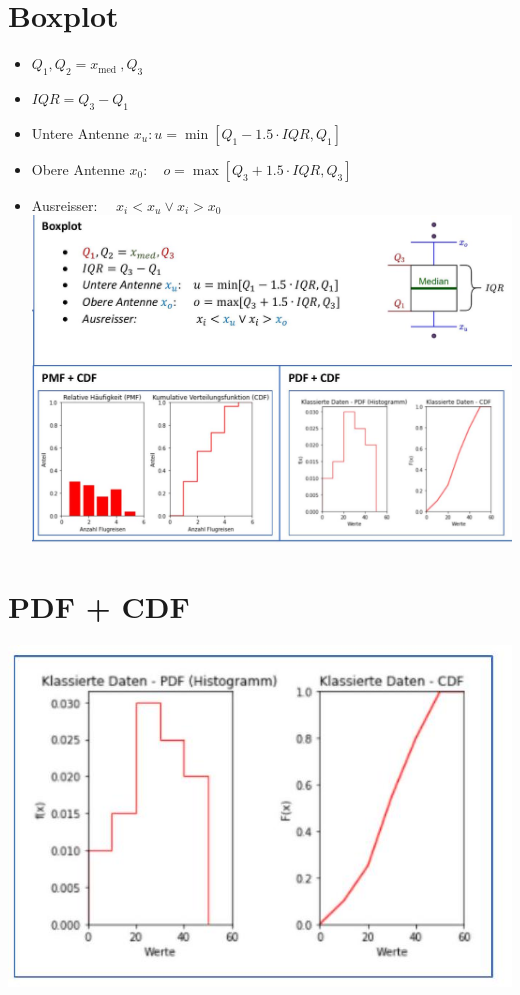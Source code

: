 \documentclass[10pt]{article}
\begin{document}
\section*{Boxplot}
\begin{itemize}
  \item $Q_{1}, Q_{2}=x_{\text {med }}, Q_{3}$
  \item $I Q R=Q_{3}-Q_{1}$
  \item Untere Antenne $x_{u}: u=\min \left[Q_{1}-1.5 \cdot I Q R, Q_{1}\right]$
  \item Obere Antenne $x_{0}: \quad o=\max \left[Q_{3}+1.5 \cdot I Q R, Q_{3}\right]$
  \item Ausreisser: $\quad x_{i}<x_{u} \vee x_{i}>x_{0}$\\
\includegraphics[max width=\textwidth, center]{2024_12_29_e932069dd64ad17e4875g-01(1)}
\end{itemize}

\section*{PDF + CDF}
\begin{center}
\includegraphics[max width=\textwidth]{2024_12_29_e932069dd64ad17e4875g-01}
\end{center}
\end{document}
